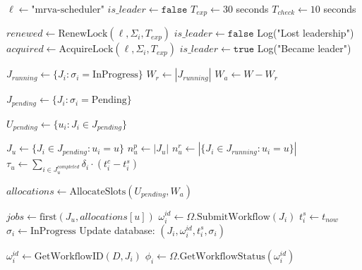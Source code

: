 \documentclass[11pt]{article}
\begin{document}
\begin{algorithmic}[1]
  \State $\ell \gets \text{"mrva-scheduler"}$
  \State $is\_leader \gets \texttt{false}$
  \State $T_{exp} \gets 30$ seconds
  \State $T_{check} \gets 10$ seconds

    \State {}
      \State $renewed \gets \text{RenewLock}(\ell, \Sigma_i, T_{exp})$
        \State $is\_leader \gets \texttt{false}$
        \State Log("Lost leadership")
      \EndIf
    \Else
      \State $acquired \gets \text{AcquireLock}(\ell, \Sigma_i, T_{exp})$
        \State $is\_leader \gets \texttt{true}$
        \State Log("Became leader")
      \EndIf
    \EndIf

    \State {}
      \State $J_{running} \gets \{J_i : \sigma_i = \text{InProgress}\}$
      \State $W_r \gets |J_{running}|$
      \State $W_a \gets W - W_r$

        \State $J_{pending} \gets \{J_i : \sigma_i = \text{Pending}\}$

          \State {}
          \State $U_{pending} \gets \{u_i : J_i \in J_{pending}\}$

            \State $J_u \gets \{J_i \in J_{pending} : u_i = u\}$
            \State $n_u^p \gets |J_u|$
            \State $n_u^r \gets |\{J_i \in J_{running} : u_i = u\}|$
            \State $\tau_u \gets \sum_{i \in J_u^{completed}} \delta_i \cdot (t_i^c - t_i^s)$
          \EndFor

          \State {}
          \State $allocations \gets \text{AllocateSlots}(U_{pending}, W_a)$

          \State {}
            \State $jobs \gets \text{first}(J_u, allocations[u])$
              \State $\omega_i^{id} \gets \Omega.\text{SubmitWorkflow}(J_i)$
              \State $t_i^s \gets t_{now}$
              \State $\sigma_i \gets \text{InProgress}$
              \State Update database: $(J_i, \omega_i^{id}, t_i^s, \sigma_i)$
            \EndFor
          \EndFor
        \EndIf
      \EndIf

      \State {}
        \State $\omega_i^{id} \gets \text{GetWorkflowID}(D, J_i)$
        \State $\phi_i \gets \Omega.\text{GetWorkflowStatus}(\omega_i^{id})$


\end{algorithmic}
\end{document}
